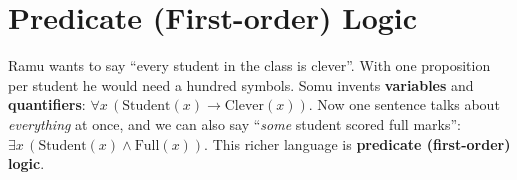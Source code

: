 \documentclass[11pt,a4paper]{article}
\begin{document}
\section{Predicate (First-order) Logic}

\begin{story}
Ramu wants to say ``every student in the class is clever''. With one proposition per student he would need a hundred symbols. Somu invents \textbf{variables} and \textbf{quantifiers}: $\forall x\,(\text{Student}(x)\to\text{Clever}(x))$. Now one sentence talks about \emph{everything} at once, and we can also say ``\emph{some} student scored full marks'': $\exists x\,(\text{Student}(x)\wedge\text{Full}(x))$. This richer language is \textbf{predicate (first-order) logic}.
\end{story}
\end{document}
